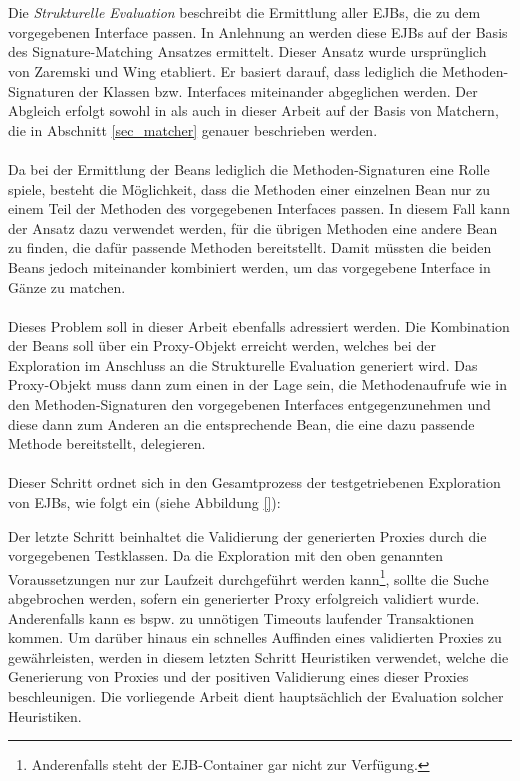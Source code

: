 \\\\
Die \emph{Strukturelle Evaluation} beschreibt die Ermittlung aller EJBs, die zu dem vorgegebenen Interface passen.
In Anlehnung an \cite{hummel08} werden diese EJBs auf der Basis des Signature-Matching Ansatzes ermittelt. Dieser Ansatz wurde ursprünglich von Zaremski und Wing \cite{moormann} etabliert. Er basiert darauf, dass lediglich die Methoden-Signaturen der Klassen bzw. Interfaces miteinander abgeglichen werden. Der Abgleich erfolgt sowohl in \cite{moormann} als auch in dieser Arbeit auf der Basis von Matchern, die in Abschnitt \ref{sec_matcher} genauer beschrieben werden.
\\\\
Da bei der Ermittlung der Beans lediglich die Methoden-Signaturen eine Rolle spiele, besteht die Möglichkeit, dass die Methoden einer einzelnen Bean nur zu einem Teil der Methoden des vorgegebenen Interfaces passen. In diesem Fall kann der Ansatz dazu verwendet werden, für die übrigen Methoden eine andere Bean zu finden, die dafür passende Methoden bereitstellt. Damit müssten die beiden Beans jedoch miteinander kombiniert werden, um das vorgegebene Interface in Gänze zu matchen.
\\\\
Dieses Problem soll in dieser Arbeit ebenfalls adressiert werden. Die Kombination der Beans soll über ein Proxy-Objekt erreicht werden, welches bei der Exploration im Anschluss an die Strukturelle Evaluation generiert wird. Das Proxy-Objekt muss dann zum einen in der Lage sein, die Methodenaufrufe wie in den Methoden-Signaturen den vorgegebenen Interfaces entgegenzunehmen und diese dann zum Anderen an die entsprechende Bean, die eine dazu passende Methode bereitstellt, delegieren.
\\\\
Dieser Schritt ordnet sich in den Gesamtprozess der testgetriebenen Exploration von EJBs, wie folgt ein (siehe Abbildung \ref{}):
\begin{figure}[h!]

\end{figure}
\noindent
Der letzte Schritt beinhaltet die Validierung der generierten Proxies durch die vorgegebenen Testklassen. Da die Exploration mit den oben genannten Voraussetzungen nur zur Laufzeit durchgeführt werden kann\footnote{Anderenfalls steht der EJB-Container gar nicht zur Verfügung.}, sollte die Suche abgebrochen werden, sofern ein generierter Proxy erfolgreich validiert wurde. Anderenfalls kann es bspw. zu unnötigen Timeouts laufender Transaktionen kommen. Um darüber hinaus ein schnelles Auffinden eines validierten Proxies zu gewährleisten, werden in diesem letzten Schritt Heuristiken verwendet, welche die Generierung von Proxies und der positiven Validierung eines dieser Proxies beschleunigen. Die vorliegende Arbeit dient hauptsächlich der Evaluation solcher Heuristiken.

